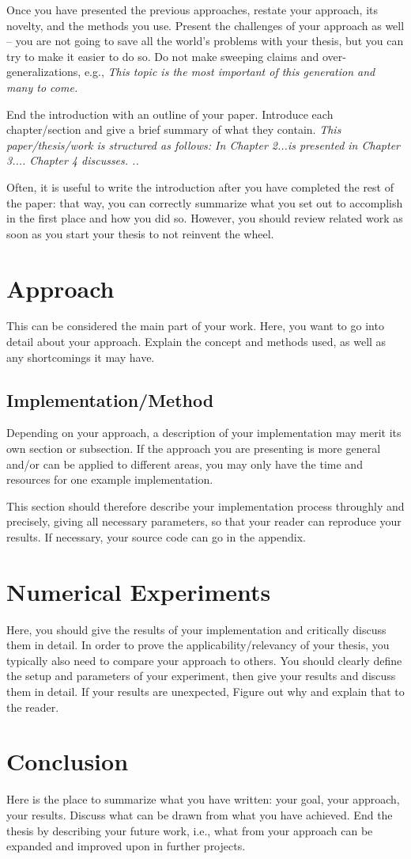 Once you have presented the previous approaches, restate your approach, its novelty, and the methods you use.
Present the challenges of your approach as well -- you are not going to save all the world's problems with your thesis, but you can try to make it
easier to do so.
Do not make sweeping claims and over-generalizations, e.g., \textit{This topic is the most important of this generation and many to come.
}

End the introduction with an outline of your paper.
Introduce each chapter/section and give a brief summary of what they contain.
\textit{This paper/thesis/work is structured as follows: In Chapter 2...is presented in Chapter 3....
	Chapter 4 discusses.
	..}

Often, it is useful to write the introduction after you have completed the rest of the paper: that way, you can correctly summarize what you set out
to accomplish in the first place and how you did so.
However, you should review related work as soon as you start your thesis to not reinvent the wheel.

\section{Approach}
This can be considered the main part of your work.
Here, you want to go into detail about your approach.
Explain the concept and methods used, as well as any shortcomings it may have.

\subsection{Implementation/Method}
Depending on your approach, a description of your implementation may merit its own section or subsection.
If the approach you are presenting is more general and/or can be applied to different areas, you may only have the time and resources for one example
implementation.

This section should therefore describe your implementation process throughly and precisely, giving all necessary parameters, so that your reader can
reproduce your results.
If necessary, your source code can go in the appendix.

\section{Numerical Experiments}
Here, you should give the results of your implementation and critically discuss them in detail.
In order to prove the applicability/relevancy of your thesis, you typically also need to compare your approach to others.
You should clearly define the setup and parameters of your experiment, then give your results and discuss them in detail.
If your results are unexpected, Figure out why and explain that to the reader.

\section{Conclusion}
Here is the place to summarize what you have written: your goal, your approach, your results.
Discuss what can be drawn from what you have achieved.
End the thesis by describing your future work, i.e., what from your approach can be expanded and improved upon in further projects.
